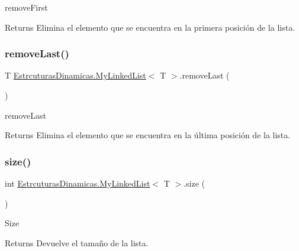 remove\+First 

\begin{DoxyReturn}{Returns}
Elimina el elemento que se encuentra en la primera posición de la lista.
\end{DoxyReturn}
\mbox{\label{class_estrcuturas_dinamicas_1_1_my_linked_list_adfd3488237f3ed5e59768d177ab22fca}} 
\subsubsection{\texorpdfstring{remove\+Last()}{removeLast()}}
{\footnotesize\ttfamily T \mbox{\hyperlink{class_estrcuturas_dinamicas_1_1_my_linked_list}{Estrcuturas\+Dinamicas.\+My\+Linked\+List}}$<$ T $>$.remove\+Last (\begin{DoxyParamCaption}{ }\end{DoxyParamCaption})}



remove\+Last 

\begin{DoxyReturn}{Returns}
Elimina el elemento que se encuentra en la última posición de la lista.
\end{DoxyReturn}
\mbox{\label{class_estrcuturas_dinamicas_1_1_my_linked_list_ab6d0ed3148cca6e0ab7d1d027d5bd5f3}} 
\subsubsection{\texorpdfstring{size()}{size()}}
{\footnotesize\ttfamily int \mbox{\hyperlink{class_estrcuturas_dinamicas_1_1_my_linked_list}{Estrcuturas\+Dinamicas.\+My\+Linked\+List}}$<$ T $>$.size (\begin{DoxyParamCaption}{ }\end{DoxyParamCaption})}



Size 

\begin{DoxyReturn}{Returns}
Devuelve el tamaño de la lista.
\end{DoxyReturn}
\mbox{\label{class_estrcuturas_dinamicas_1_1_my_linked_list_a442e0c07ad2848f88545d4a6d7e4dec6}} 
